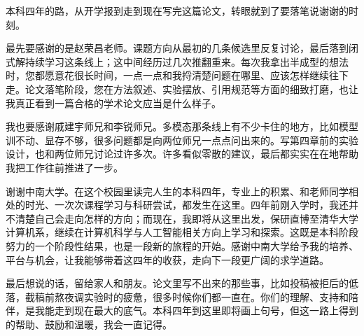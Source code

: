 \begin{acknowledgements} 


本科四年的路，从开学报到走到现在写完这篇论文，转眼就到了要落笔说谢谢的时刻。

最先要感谢的是赵荣昌老师。课题方向从最初的几条候选里反复讨论，最后落到闭式解持续学习这条线上；这中间经历过几次推翻重来。每次我拿出半成型的想法时，您都愿意花很长时间，一点一点和我捋清楚问题在哪里、应该怎样继续往下走。论文落笔阶段，您在方法叙述、实验摆放、引用规范等方面的细致打磨，也让我真正看到一篇合格的学术论文应当是什么样子。

我也要感谢戚建宇师兄和李锐师兄。多模态那条线上有不少卡住的地方，比如模型训不动、显存不够，很多问题都是向两位师兄一点点问出来的。写第四章前的实验设计，也和两位师兄讨论过许多次。许多看似零散的建议，最后都实实在在地帮助我把工作往前推进了一步。

谢谢中南大学。在这个校园里读完人生的本科四年，专业上的积累、和老师同学相处的时光、一次次课程学习与科研尝试，都发生在这里。四年前刚入学时，我还并不清楚自己会走向怎样的方向；而现在，我即将从这里出发，保研直博至清华大学计算机系，继续在计算机科学与人工智能相关方向上学习和探索。这既是本科阶段努力的一个阶段性结果，也是一段新的旅程的开始。感谢中南大学给予我的培养、平台与机会，让我能够带着这四年的收获，走向下一段更广阔的求学道路。

最后想说的话，留给家人和朋友。论文里写不出来的那些事，比如投稿被拒后的低落，截稿前熬夜调实验时的疲惫，很多时候你们都一直在。你们的理解、支持和陪伴，是我能走到现在最大的底气。本科四年到这里即将画上句号，但这一路上得到的帮助、鼓励和温暖，我会一直记得。

\end{acknowledgements}
